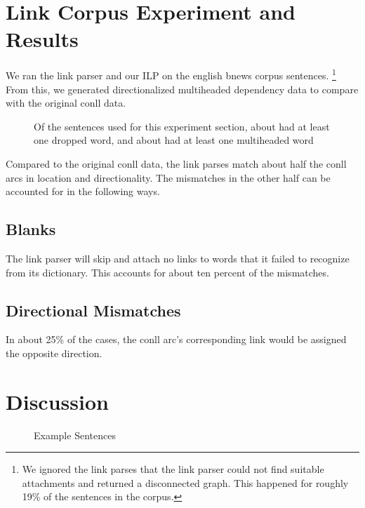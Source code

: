 \documentclass[11pt]{article}
\begin{document}


\section{Link Corpus Experiment and Results}
We ran the link parser and our ILP on the english bnews corpus sentences. \footnote{We ignored the link parses that the link parser could not find suitable attachments and returned a disconnected graph. This happened for roughly 19\% of the sentences in the corpus.} 
From this, we generated directionalized multiheaded dependency data to compare with the original conll data.

\begin{figure}[ht!]
  \centering
  \small
  
  \caption{\small Of the sentences used for this experiment section, about 
    had at least one dropped word, and about 
    had at least one multiheaded word}
\end{figure}



Compared to the original conll data, the link parses match about half the conll arcs in location and directionality. The mismatches in the other half can be accounted for in the following ways.

\subsection{Blanks}
The link parser will skip and attach no links to words that it failed to recognize from its dictionary. This accounts for about ten percent of the mismatches.

\subsection{Directional Mismatches}
In about 25\% of the cases, the conll arc's corresponding link would be assigned the opposite direction.


\section{Discussion}


\begin{figure}[ht!]
  \centering
  
  \caption{Example Sentences}
  \label{fig:parses}
\end{figure}
\end{document}
